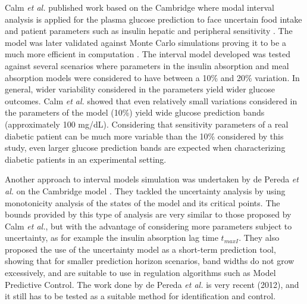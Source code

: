 Calm \textit{et al.} published work based on the Cambridge where modal interval analysis is applied for the plasma glucose prediction to face uncertain food intake and patient parameters such as insulin hepatic and peripheral sensitivity \cite{calm2007prediction}. The model was later validated against Monte Carlo simulations proving it to be a much more efficient in computation \cite{calm2010comparison}. The interval model developed was tested against several scenarios where parameters in the insulin absorption and meal absorption models were considered to have between a 10\% and 20\% variation. In general, wider variability considered in the parameters yield wider glucose outcomes. Calm \textit{et al.} showed that even relatively small variations considered in the parameters of the model (10\%) yield wide glucose prediction bands (approximately 100 mg/dL). Considering that sensitivity parameters of a real diabetic patient can be much more variable than the 10\% considered by this study, even larger glucose prediction bands are expected when characterizing diabetic patients in an experimental setting.

Another approach to interval models simulation was undertaken by de Pereda \textit{et al.} on the Cambridge model \cite{de2012prediction}. They tackled the uncertainty analysis by using monotonicity analysis of the states of the model and its critical points. The bounds provided by this type of analysis are very similar to those proposed by Calm \textit{et al.}, but with the advantage of considering more parameters subject to uncertainty, as for example the insulin absorption lag time $t_{maxI}$. They also proposed the use of the uncertainty model as a short-term prediction tool, showing that for smaller prediction horizon scenarios, band widths do not grow excessively, and are suitable to use in regulation algorithms such as Model Predictive Control. The work done by de Pereda \textit{et al.} is very recent (2012), and it still has to be tested as a suitable method for identification and control.

